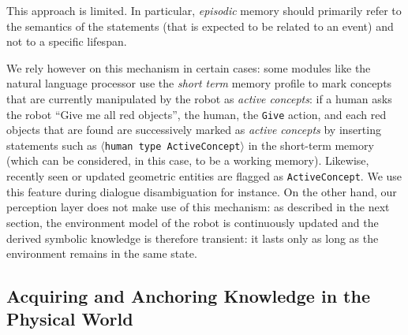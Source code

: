 \documentclass[preprint,3p,times]{elsarticle}
\newcommand{\concept}[1]{{\small \texttt{#1}}}
\newcommand{\stmt}[1]{{\footnotesize\tt$\langle$#1\relax$\rangle$}}
\begin{document}
This approach is limited. In particular, \emph{episodic} memory should primarily
refer to the semantics of the statements (that is expected to be related to an
event) and not to a specific lifespan.

We rely however on this mechanism in certain cases: some modules
like the natural language processor use the {\it short term} memory profile to
mark concepts that are currently manipulated by the
robot as \emph{active concepts}: if a human asks the robot ``Give
me all red objects'', the human, the \concept{Give} action, and each red
objects that are found are successively marked as \emph{active concepts} by
inserting statements such as \stmt{human type ActiveConcept} in the short-term
memory (which can be considered, in this case, to be a working memory).
Likewise, recently seen or updated geometric entities are flagged as
\concept{ActiveConcept}. We use this feature during dialogue disambiguation for
instance. On the other hand, our perception layer does not make use of this
mechanism: as described in the next section, the environment model of the robot
is continuously updated and the derived symbolic knowledge is therefore
transient: it lasts only as long as the environment remains in the same state.


\subsection{Acquiring and Anchoring Knowledge in the Physical World}
\label{sect|sit-ass}
\end{document}
